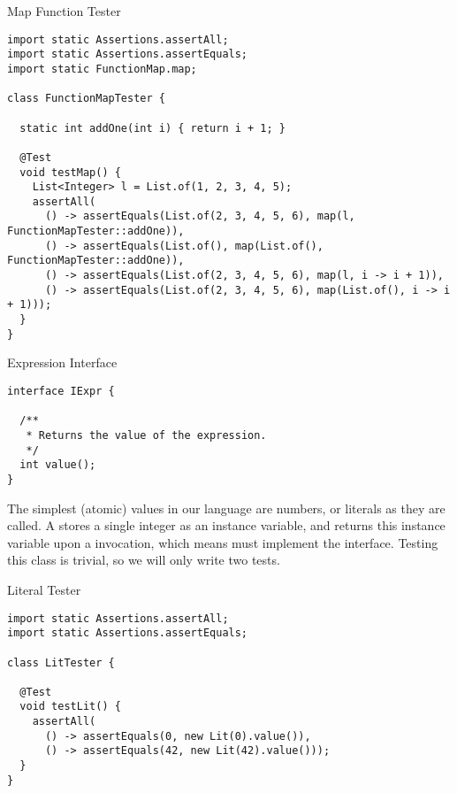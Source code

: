\begin{cl}[]{Map Function Tester}
\begin{lstlisting}[language=MyJava]
import static Assertions.assertAll;
import static Assertions.assertEquals;
import static FunctionMap.map;

class FunctionMapTester {

  static int addOne(int i) { return i + 1; }

  @Test
  void testMap() {
    List<Integer> l = List.of(1, 2, 3, 4, 5);
    assertAll(
      () -> assertEquals(List.of(2, 3, 4, 5, 6), map(l, FunctionMapTester::addOne)),
      () -> assertEquals(List.of(), map(List.of(), FunctionMapTester::addOne)),
      () -> assertEquals(List.of(2, 3, 4, 5, 6), map(l, i -> i + 1)),
      () -> assertEquals(List.of(2, 3, 4, 5, 6), map(List.of(), i -> i + 1)));
  }
}
\end{lstlisting}
\end{cl}


\begin{cl}[]{Expression Interface}
\begin{lstlisting}[language=MyJava]
interface IExpr {

  /**
   * Returns the value of the expression.
   */
  int value();
}
\end{lstlisting}
\end{cl}

The simplest (atomic) values in our language are numbers, or literals as they are called. A  stores a single integer as an instance variable, and returns this instance variable upon a  invocation, which means  must implement the  interface. Testing this class is trivial, so we will only write two tests.

\begin{cl}[]{Literal Tester}
\begin{lstlisting}[language=MyJava]
import static Assertions.assertAll;
import static Assertions.assertEquals;

class LitTester {

  @Test
  void testLit() {
    assertAll(
      () -> assertEquals(0, new Lit(0).value()),      
      () -> assertEquals(42, new Lit(42).value()));
  }
}
\end{lstlisting}
\end{cl}

